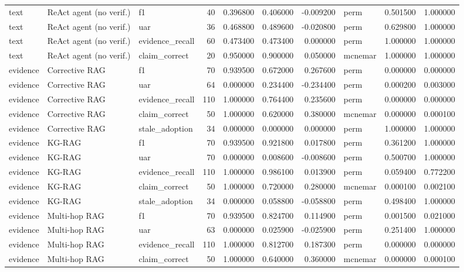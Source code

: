 \begin{table}
\begin{tabular}{lllrrrrlrr}
text & ReAct agent (no verif.) & f1 & 40 & 0.396800 & 0.406000 & -0.009200 & perm & 0.501500 & 1.000000 \\
text & ReAct agent (no verif.) & uar & 36 & 0.468800 & 0.489600 & -0.020800 & perm & 0.629800 & 1.000000 \\
text & ReAct agent (no verif.) & evidence\_recall & 60 & 0.473400 & 0.473400 & 0.000000 & perm & 1.000000 & 1.000000 \\
text & ReAct agent (no verif.) & claim\_correct & 20 & 0.950000 & 0.900000 & 0.050000 & mcnemar & 1.000000 & 1.000000 \\
evidence & Corrective RAG & f1 & 70 & 0.939500 & 0.672000 & 0.267600 & perm & 0.000000 & 0.000000 \\
evidence & Corrective RAG & uar & 64 & 0.000000 & 0.234400 & -0.234400 & perm & 0.000200 & 0.003000 \\
evidence & Corrective RAG & evidence\_recall & 110 & 1.000000 & 0.764400 & 0.235600 & perm & 0.000000 & 0.000000 \\
evidence & Corrective RAG & claim\_correct & 50 & 1.000000 & 0.620000 & 0.380000 & mcnemar & 0.000000 & 0.000100 \\
evidence & Corrective RAG & stale\_adoption & 34 & 0.000000 & 0.000000 & 0.000000 & perm & 1.000000 & 1.000000 \\
evidence & KG-RAG & f1 & 70 & 0.939500 & 0.921800 & 0.017800 & perm & 0.361200 & 1.000000 \\
evidence & KG-RAG & uar & 70 & 0.000000 & 0.008600 & -0.008600 & perm & 0.500700 & 1.000000 \\
evidence & KG-RAG & evidence\_recall & 110 & 1.000000 & 0.986100 & 0.013900 & perm & 0.059400 & 0.772200 \\
evidence & KG-RAG & claim\_correct & 50 & 1.000000 & 0.720000 & 0.280000 & mcnemar & 0.000100 & 0.002100 \\
evidence & KG-RAG & stale\_adoption & 34 & 0.000000 & 0.058800 & -0.058800 & perm & 0.498400 & 1.000000 \\
evidence & Multi-hop RAG & f1 & 70 & 0.939500 & 0.824700 & 0.114900 & perm & 0.001500 & 0.021000 \\
evidence & Multi-hop RAG & uar & 63 & 0.000000 & 0.025900 & -0.025900 & perm & 0.251400 & 1.000000 \\
evidence & Multi-hop RAG & evidence\_recall & 110 & 1.000000 & 0.812700 & 0.187300 & perm & 0.000000 & 0.000000 \\
evidence & Multi-hop RAG & claim\_correct & 50 & 1.000000 & 0.640000 & 0.360000 & mcnemar & 0.000000 & 0.000100 \\

\end{tabular}
\end{table}
